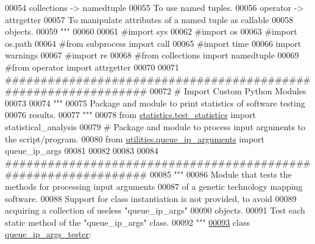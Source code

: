 \begin{DoxyCode}
00054 \textcolor{stringliteral}{    collections -> namedtuple}
00055 \textcolor{stringliteral}{                To use named tuples.}
00056 \textcolor{stringliteral}{    operator -> attrgetter}
00057 \textcolor{stringliteral}{                To manipulate attributes of a named tuple as callable}
00058 \textcolor{stringliteral}{                    objects.}
00059 \textcolor{stringliteral}{"""}
00060 
00061 \textcolor{comment}{#import sys}
00062 \textcolor{comment}{#import os}
00063 \textcolor{comment}{#import os.path}
00064 \textcolor{comment}{#from subprocess import call}
00065 \textcolor{comment}{#import time}
00066 \textcolor{keyword}{import} warnings
00067 \textcolor{comment}{#import re}
00068 \textcolor{comment}{#from collections import namedtuple}
00069 \textcolor{comment}{#from operator import attrgetter}
00070 
00071 \textcolor{comment}{###############################################################}
00072 \textcolor{comment}{#   Import Custom Python Modules}
00073 
00074 \textcolor{stringliteral}{"""}
00075 \textcolor{stringliteral}{    Package and module to print statistics of software testing}
00076 \textcolor{stringliteral}{        results.}
00077 \textcolor{stringliteral}{"""}
00078 \textcolor{keyword}{from} \hyperlink{namespacestatistics_1_1test__statistics}{statistics.test\_statistics} \textcolor{keyword}{import} statistical\_analysis
00079 \textcolor{comment}{# Package and module to process input arguments to the script/program.}
00080 \textcolor{keyword}{from} \hyperlink{namespaceutilities_1_1queue__ip__arguments}{utilities.queue\_ip\_arguments} \textcolor{keyword}{import} queue\_ip\_args
00081 
00082 
00083 
00084 \textcolor{comment}{###############################################################}
00085 \textcolor{stringliteral}{"""}
00086 \textcolor{stringliteral}{    Module that tests the methods for processing input arguments}
00087 \textcolor{stringliteral}{        of a genetic technology mapping software.}
00088 \textcolor{stringliteral}{    Support for class instantiation is not provided, to avoid}
00089 \textcolor{stringliteral}{        acquiring a collection of useless "queue\_ip\_args"}
00090 \textcolor{stringliteral}{        objects.}
00091 \textcolor{stringliteral}{    Test each static method of the "queue\_ip\_args" class.}
00092 \textcolor{stringliteral}{"""}
\hypertarget{queue__ip__arguments__tester_8py_source_l00093}{}\hyperlink{classutilities_1_1queue__ip__arguments__tester_1_1queue__ip__args__tester}{00093} \textcolor{keyword}{class }\hyperlink{classutilities_1_1queue__ip__arguments__tester_1_1queue__ip__args__tester}{queue\_ip\_args\_tester}:

\end{DoxyCode}
